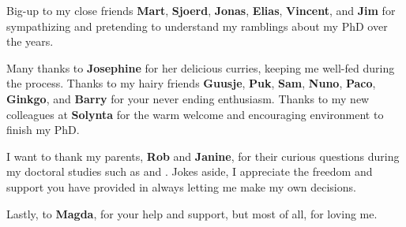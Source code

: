 \bigbreak \noindent
Big-up to my close friends \textbf{Mart}, \textbf{Sjoerd}, \textbf{Jonas}, \textbf{Elias}, \textbf{Vincent}, and \textbf{Jim} for sympathizing and pretending to understand my ramblings about my PhD over the years. 

\bigbreak \noindent
Many thanks to \textbf{Josephine} for her delicious curries, keeping me well-fed during the process. Thanks to my hairy friends \textbf{Guusje}, \textbf{Puk}, \textbf{Sam}, \textbf{Nuno}, \textbf{Paco}, \textbf{Ginkgo}, and \textbf{Barry} for your never ending enthusiasm. Thanks to my new colleagues at \textbf{Solynta} for the warm welcome and encouraging environment to finish my PhD. 

\bigbreak \noindent
I want to thank my parents, \textbf{Rob} and \textbf{Janine}, for their curious questions during my doctoral studies such as  and . Jokes aside, I appreciate the freedom and support you have provided in always letting me make my own decisions.

\bigbreak \noindent
Lastly, to \textbf{Magda}, for your help and support, but most of all, for loving me. 

\newpage